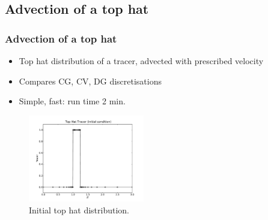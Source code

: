 
%

\subsection{Advection of a top hat}

\begin{frame}
  \frametitle{Advection of a top hat}
  \begin{itemize}
  \item Top hat distribution of a tracer, advected with prescribed velocity
  \item Compares CG, CV, DG discretisations
  \item Simple, fast: run time 2 min.
  \end{itemize}

  \begin{figure}
    \centering
    \includegraphics[width=0.45\textwidth]{./top_hat/top_hat_ic.pdf}
    \caption{Initial top hat distribution.}
  \end{figure}
\end{frame}

